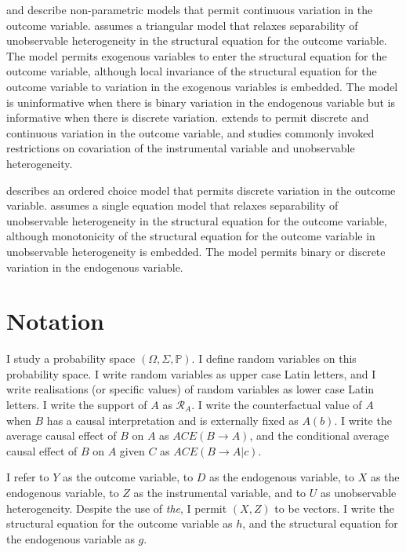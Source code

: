 \documentclass[12pt,a4paper,twoside]{article}
\numberwithin{equation}{section}
\begin{document}
\cite{c05} and \cite{kI09} describe non-parametric models that permit continuous variation in the outcome variable. \cite{c05} assumes a triangular model that relaxes separability of unobservable heterogeneity in the structural equation for the outcome variable. The model permits exogenous variables to enter the structural equation for the outcome variable, although local invariance of the structural equation for the outcome variable to variation in the exogenous variables is embedded. The model is uninformative when there is binary variation in the endogenous variable but is informative when there is discrete variation. \cite{kI09} extends \cite{bp97} to permit discrete and continuous variation in the outcome variable, and studies commonly invoked restrictions on covariation of the instrumental variable and unobservable heterogeneity.

\cite{c10} describes an ordered choice model that permits discrete variation in the outcome variable. \cite{c10} assumes a single equation model that relaxes separability of unobservable heterogeneity in the structural equation for the outcome variable, although monotonicity of the structural equation for the outcome variable in unobservable heterogeneity is embedded. The model permits binary or discrete variation in the endogenous variable.
\section*{Notation}
I study a probability space $(\Omega,\Sigma,\mathbb{P})$. I define random variables on this probability space. I write random variables as upper case Latin letters, and I write realisations (or specific values) of random variables as lower case Latin letters. I write the support of $A$ as $\mathcal{R}_A$. I write the counterfactual value of $A$ when $B$ has a causal interpretation and is externally fixed as $A(b)$. I write the average causal effect of $B$ on $A$ as $ACE(B\rightarrow A)$, and the conditional average causal effect of $B$ on $A$ given $C$ as $ACE(B\rightarrow A|c)$.

I refer to $Y$ as the outcome variable, to $D$ as the endogenous variable, to $X$ as the endogenous variable, to $Z$ as the instrumental variable, and to $U$ as unobservable heterogeneity. Despite the use of \emph{the}, I permit $(X,Z)$ to be vectors. I write the structural equation for the outcome variable as $h$, and the structural equation for the endogenous variable as $g$.  
\end{document}
